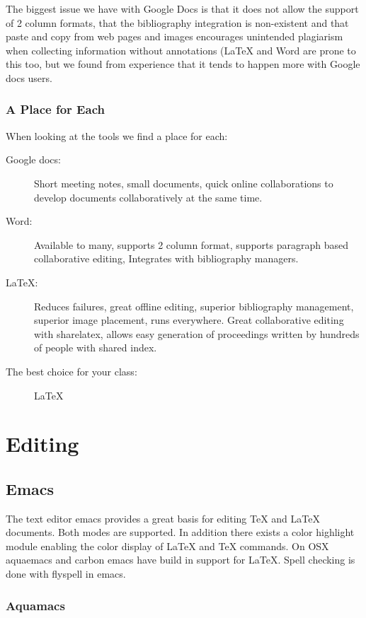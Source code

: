 The biggest issue we have with Google Docs is that it does not allow the
support of 2 column formats, that the bibliography integration is
non-existent and that paste and copy from web pages and images
encourages unintended plagiarism when collecting information without
annotations (LaTeX and Word are prone to this too, but we found from
experience that it tends to happen more with Google docs users.

\subsubsection{A Place for Each}\label{a-place-for-each}

When looking at the tools we find a place for each:

\begin{description}
\item[Google docs:]
Short meeting notes, small documents, quick online collaborations to
develop documents collaboratively at the same time.
\item[Word:]
Available to many, supports 2 column format, supports paragraph based
collaborative editing, Integrates with bibliography managers.
\item[LaTeX:]
Reduces failures, great offline editing, superior bibliography
management, superior image placement, runs everywhere. Great
collaborative editing with sharelatex, allows easy generation of
proceedings written by hundreds of people with shared index.
\item[The best choice for your class:]
LaTeX
\end{description}

\section{Editing}\label{editing}

\subsection{Emacs}\label{emacs}

The text editor emacs provides a great basis for editing TeX and LaTeX
documents. Both modes are supported. In addition there exists a color
highlight module enabling the color display of LaTeX and TeX commands.
On OSX aquaemacs and carbon emacs have build in support for LaTeX. Spell
checking is done with flyspell in emacs.

\subsubsection{Aquamacs}

